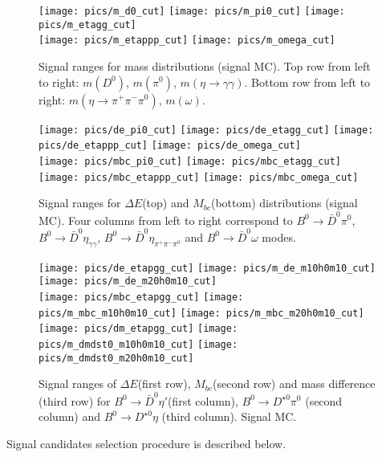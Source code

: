 \documentclass[preprint,aps,showpacs]{revtex4}
\newcommand{\bdpi}{\ensuremath{B^0\to \bar D^0\pi^0}\xspace}
\newcommand{\bdetagg}{\ensuremath{B^0\to \bar D^0\eta_{\gamma\gamma}}\xspace}
\newcommand{\bdetap}{\ensuremath{B^0\to \bar D^0\eta\prime}\xspace}
\newcommand{\bdetappp}{\ensuremath{B^0\to \bar D^0\eta_{\pi^+\pi^-\pi^0}}\xspace}
\newcommand{\bdomega}{\ensuremath{B^0\to \bar D^0\omega}\xspace}
\newcommand{\etagg}{\ensuremath{\eta\to\gamma\gamma}\xspace}
\newcommand{\etappp}{\ensuremath{\eta\to\pi^+\pi^-\pi^0}\xspace}
\newcommand{\de}{\ensuremath{\Delta E}\xspace}
\newcommand{\mbc}{\ensuremath{M_{bc}}\xspace}
\begin{document}
\begin{figure}[htb]
 \texttt{[image: pics/m\_d0\_cut]}
 \texttt{[image: pics/m\_pi0\_cut]}
 \texttt{[image: pics/m\_etagg\_cut]}\\
 \texttt{[image: pics/m\_etappp\_cut]}
 \texttt{[image: pics/m\_omega\_cut]}\\
 \caption{Signal ranges for mass distributions (signal MC). Top row from left to right: $m(D^0)$, $m(\pi^0)$, $m(\etagg)$. Bottom row from left to right: $m(\etappp)$, $m(\omega)$.}
 \label{fig:signal_mass_ranges}
\end{figure}

\begin{figure}[htb]
 \texttt{[image: pics/de\_pi0\_cut]}
 \texttt{[image: pics/de\_etagg\_cut]}
 \texttt{[image: pics/de\_etappp\_cut]}
 \texttt{[image: pics/de\_omega\_cut]}\\
 \texttt{[image: pics/mbc\_pi0\_cut]}
 \texttt{[image: pics/mbc\_etagg\_cut]}
 \texttt{[image: pics/mbc\_etappp\_cut]}
 \texttt{[image: pics/mbc\_omega\_cut]}\\
 \caption{Signal ranges for \de (top) and \mbc (bottom) distributions (signal MC). Four columns from left to right correspond to \bdpi, \bdetagg, \bdetappp and \bdomega modes.}
 \label{fig:signal_de_mbc_ranges}
\end{figure}

\begin{figure}[htb]
 \texttt{[image: pics/de\_etapgg\_cut]}
 \texttt{[image: pics/m\_de\_m10h0m10\_cut]}
 \texttt{[image: pics/m\_de\_m20h0m10\_cut]}\\
 \texttt{[image: pics/mbc\_etapgg\_cut]}
 \texttt{[image: pics/m\_mbc\_m10h0m10\_cut]}
 \texttt{[image: pics/m\_mbc\_m20h0m10\_cut]}\\
 \texttt{[image: pics/dm\_etapgg\_cut]}
 \texttt{[image: pics/m\_dmdst0\_m10h0m10\_cut]}
 \texttt{[image: pics/m\_dmdst0\_m20h0m10\_cut]}
 \caption{Signal ranges of \de (first row), \mbc (second row) and mass difference (third row) for \bdetap (first column), $B^{0}\to D^{\star0}\pi^0$ (second column) and $B^{0}\to D^{\star0}\eta$ (third column). Signal MC.}
 \label{fig:signal_etap_dst0}
\end{figure}
Signal candidates selection procedure is described below.
\end{document}
